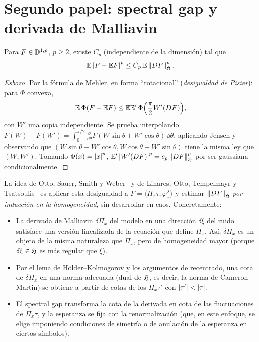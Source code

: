 \section{Segundo papel: spectral gap y derivada de Malliavin}

\begin{proposicion}
Para $F\in\mathbb{D}^{1,p}$, $p\ge2$, existe $C_p$
(independiente de la dimensión) tal que
\[
  \mathbb{E}\left\lvert F-\mathbb{E} F\right\rvert^p\le C_p\,\mathbb{E}\left\lVert DF\right\rVert^p_{\mathfrak{H}}.
\]
\end{proposicion}

\begin{proof}[Esbozo]
Por la fórmula de Mehler, en forma ``rotacional'' (\emph{desigualdad de Pisier}): para $\Phi$
convexa,
\[
  \mathbb{E}\,\Phi(F-\mathbb{E} F)\le\mathbb{E}\mathbb{E}'\,\Phi\Big(\frac\pi2W'(DF)\Big),
\]
con $W'$ una copia independiente. Se prueba interpolando $F(W)-F(W')=\int_0^{\pi/2}\frac{\dd}{\dd\theta}F(W\sin\theta+
W'\cos\theta)\,\dd\theta$, aplicando Jensen y observando que $(W\sin\theta+W'\cos\theta,W\cos\theta-W'\sin\theta)$ tiene
la misma ley que $(W,W')$. Tomando $\Phi(x)=\left\lvert x\right\rvert^p$, $\mathbb{E}'\left\lvert W'(DF)\right\rvert^p=c_p\left\lVert DF\right\rVert^p_{\mathfrak{H}}$ por ser gaussiana
condicionalmente.
\end{proof}

La idea de Otto, Sauer, Smith y Weber~\cite{OttoSauerSmithWeber25} y de Linares, Otto, Tempelmayr y Tsatsoulis~\cite{LinaresOttoTempelmayrTsatsoulis24}
es aplicar esta desigualdad a $F=\big\langle\Pi_x\tau,\varphi^\lambda_x\big\rangle$ y estimar $\left\lVert DF\right\rVert_{\mathfrak{H}}$ \emph{por inducción en la homogeneidad},
sin desarrollar en caos. Concretamente:
\begin{itemize}
  \item La derivada de Malliavin $\delta\Pi_x$ del modelo en una dirección $\delta\xi$ del ruido satisface una
  versión linealizada de la ecuación que define $\Pi_x$. Así, $\delta\Pi_x$ es un objeto de la misma
  naturaleza que $\Pi_x$, pero de homogeneidad mayor (porque $\delta\xi\in\mathfrak{H}$ es más regular que $\xi$).
  \item Por el lema de Hölder--Kolmogorov y los argumentos de recentrado, una cota de $\delta\Pi_x$ en
  una norma adecuada (dual de $\mathfrak{H}$, es decir, la norma de Cameron--Martin) se obtiene a
  partir de cotas de los $\Pi_x\tau'$ con $\left\lvert \tau'\right\rvert<\left\lvert \tau\right\rvert$.
  \item El spectral gap transforma la cota de la derivada en cota de las fluctuaciones de $\Pi_x\tau$,
  y la esperanza se fija con la renormalización (que, en este enfoque, se elige imponiendo
  condiciones de simetría o de anulación de la esperanza en ciertos símbolos).
\end{itemize}

